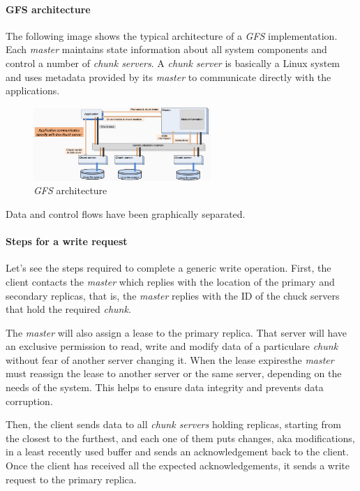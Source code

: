 \paragraph{GFS architecture}
The following image shows the typical architecture of a \emph{GFS} implementation.
Each \emph{master} maintains state information about all system components and
control a number of \emph{chunk servers}. A \emph{chunk server} is basically a
Linux system and uses metadata provided by its \emph{master} to communicate
directly with the applications.

\begin{figure}[ht!]
    \centering
    \includegraphics[width=0.6\textwidth]{images/gfs-architecture.png}
    \caption{\emph{GFS} architecture}
\end{figure}

\begin{note}
    Data and control flows have been graphically separated.
\end{note}

\paragraph{Steps for a write request}
Let's see the steps required to complete a generic write operation.
First, the client contacts the \emph{master} which replies with the location
of the primary and secondary replicas, that is, the \emph{master} replies with
the ID of the chuck servers that hold the required \emph{chunk}.

The \emph{master} will also assign a lease to the primary replica. That
server will have an exclusive permission to read, write and modify data of a
particulare \emph{chunk} without fear of another server changing it. When the
lease expires\footnotemark the \emph{master} must reassign the lease to another
server or the same server, depending on the needs of the system. This helps
to ensure data integrity and prevents data corruption.


Then, the client sends data to all \emph{chunk servers} holding replicas, starting
from the closest to the furthest, and each one of them puts changes, aka
modifications, in a least recently used buffer and sends an acknowledgement back
to the client. Once the client has received all the expected acknowledgements,
it sends a write request to the primary replica.

